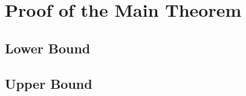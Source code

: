 \documentclass[11pt]{article}
\begin{document}
\section{Proof of the Main Theorem}
\label{sec:proofs}



\subsection{Lower Bound}
\label{sec:lower-bound}









\subsection{Upper Bound}
\label{sec:upper-bound}















\end{document}
